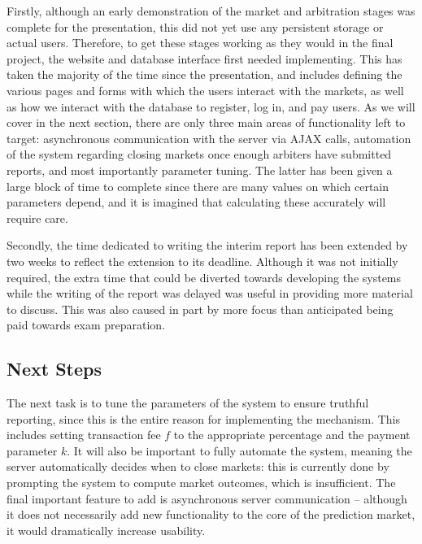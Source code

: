 \documentclass[10pt,a4paper]{article}
\theoremstyle{plain}
\theoremstyle{definition}
\begin{document}
Firstly, although an early demonstration of the market and arbitration stages
was complete for the presentation, this did not yet use any persistent storage
or actual users. Therefore, to get these stages working as they would in the
final project, the website and database interface first needed implementing.
This has taken the majority of the time since the presentation, and includes
defining the various pages and forms with which the users interact with the
markets, as well as how we interact with the database to register, log in, and
pay users. As we will cover in the next section, there are only three main
areas of functionality left to target: asynchronous communication with the
server via AJAX calls, automation of the system regarding closing markets once
enough arbiters have submitted reports, and most importantly parameter tuning.
The latter has been given a large block of time to complete since there are
many values on which certain parameters depend, and it is imagined that
calculating these accurately will require care.

Secondly, the time dedicated to writing the interim report has been extended by
two weeks to reflect the extension to its deadline. Although it was not
initially required, the extra time that could be diverted towards developing
the systems while the writing of the report was delayed was useful in providing
more material to discuss. This was also caused in part by more focus than
anticipated being paid towards exam preparation.

\subsection{Next Steps}


The next task is to tune the parameters of the system to ensure truthful
reporting, since this is the entire reason for implementing the mechanism. This
includes setting transaction fee $f$ to the appropriate percentage and the
payment parameter $k$. It will also be important to fully automate the system,
meaning the server automatically decides when to close markets: this is
currently done by prompting the system to compute market outcomes, which is
insufficient. The final important feature to add is asynchronous server
communication -- although it does not necessarily add new functionality to the
core of the prediction market, it would dramatically increase usability. 
\end{document}
